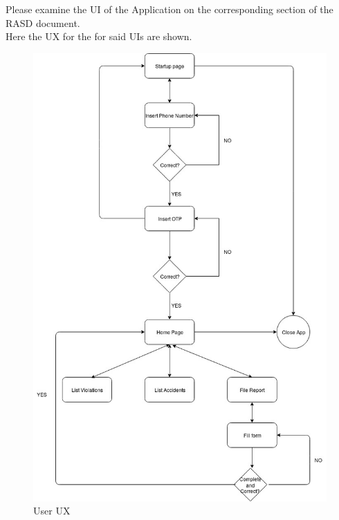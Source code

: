 \begin{center}
Please examine the UI of the Application on the corresponding 
section of the RASD document.\\
Here the UX for the for said UIs are shown.
\end{center}
\begin{figure}[H]
	\centering
    \includegraphics[scale=0.5]{Images/user_ux.jpg}
    \caption{\label{fig:UserUX}User UX}
\end{figure}
\newpage
\vspace{2cm}
\newpage
